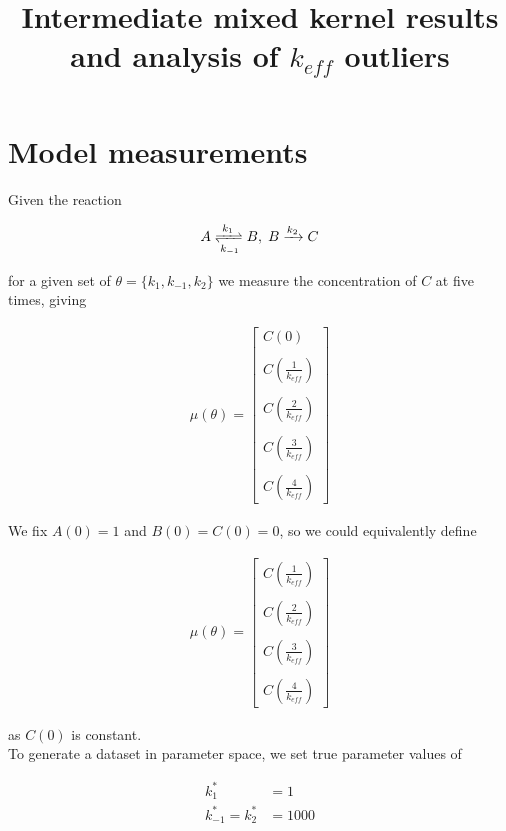 \documentclass[11pt]{article}
\title{Intermediate mixed kernel results and analysis of
  $k_{eff}$ outliers}
\begin{document}
\maketitle

\section{Model measurements}

Given the reaction

\begin{align*}
  A \xrightleftharpoons[k_{-1}]{k_1} B, \; B \xrightarrow[]{k_2} C
\end{align*}

for a given set of $\theta = \{k_1, k_{-1}, k_2\}$ we measure the concentration
of $C$ at five times, giving

\begin{align*}
  \mu(\theta) = \begin{bmatrix} C(0) \\ \\ C(\frac{1}{k_{eff}}) \\ \\
    C(\frac{2}{k_{eff}}) \\ \\ C(\frac{3}{k_{eff}}) \\ \\
    C(\frac{4}{k_{eff}}) \end{bmatrix}
\end{align*}

We fix $A(0) = 1$ and $B(0) = C(0) = 0$, so we could equivalently define

\begin{align*}
  \mu(\theta) = \begin{bmatrix} C(\frac{1}{k_{eff}}) \\ \\
    C(\frac{2}{k_{eff}}) \\ \\ C(\frac{3}{k_{eff}}) \\ \\
    C(\frac{4}{k_{eff}}) \end{bmatrix}
\end{align*}

as $C(0)$ is constant. \\

To generate a dataset in parameter space, we set true parameter values
of 

\begin{align*}
  k_1^* &= 1 \\
  k_{-1}^* = k_2^* &= 1000 \\
\end{align*}
\end{document}
